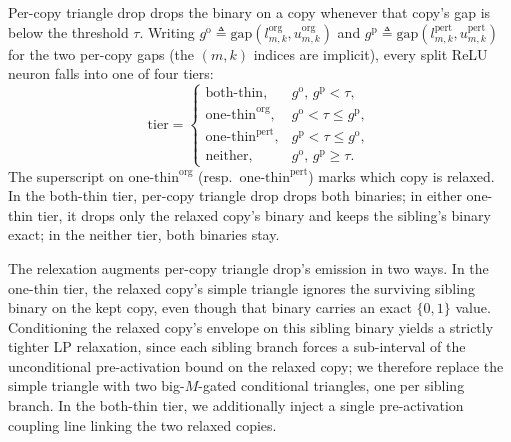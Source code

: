 \documentclass[11pt]{article}
\begin{document}
Per-copy triangle drop drops the binary on a copy whenever that copy's gap is below the threshold $\tau$. Writing $g^{\mathrm{o}} \triangleq \mathrm{gap}(l^{\mathrm{org}}_{m,k}, u^{\mathrm{org}}_{m,k})$ and $g^{\mathrm{p}} \triangleq \mathrm{gap}(l^{\mathrm{pert}}_{m,k}, u^{\mathrm{pert}}_{m,k})$ for the two per-copy gaps (the $(m,k)$ indices are implicit), every split ReLU neuron falls into one of four tiers:
\begin{equation}
\mathrm{tier} = \begin{cases}
  \text{both-thin}, & g^{\mathrm{o}}\!,\, g^{\mathrm{p}} \!<\! \tau, \\
  \text{one-thin}^{\mathrm{org}}, & g^{\mathrm{o}} \!<\! \tau \!\le\! g^{\mathrm{p}}, \\
  \text{one-thin}^{\mathrm{pert}}, & g^{\mathrm{p}} \!<\! \tau \!\le\! g^{\mathrm{o}}, \\
  \text{neither}, & g^{\mathrm{o}}\!,\, g^{\mathrm{p}} \!\ge\! \tau.
\end{cases}
\label{eq:sg_tiers}
\end{equation}
The superscript on $\text{one-thin}^{\mathrm{org}}$ (resp.\ $\text{one-thin}^{\mathrm{pert}}$) marks which copy is relaxed.
In the both-thin tier, per-copy triangle drop drops both binaries; in either one-thin tier, it drops only the relaxed copy's binary and keeps the sibling's binary exact; in the neither tier, both binaries stay.

The relexation augments per-copy triangle drop's emission in two ways. 
In the one-thin tier, the relaxed copy's simple triangle ignores 
the surviving sibling binary on the kept copy, even though that binary carries an exact 
$\{0, 1\}$ value. Conditioning the relaxed copy's envelope on this sibling binary yields a strictly 
tighter LP relaxation, since each sibling branch forces a sub-interval of the unconditional pre-activation 
bound on the relaxed copy; we therefore replace the simple triangle with two big-$M$-gated conditional triangles, 
one per sibling branch. In the both-thin tier, we additionally inject a single pre-activation coupling 
line linking the two relaxed copies.
\end{document}
